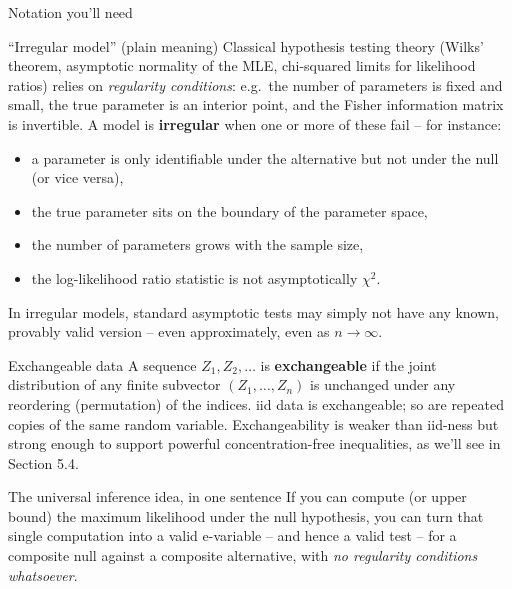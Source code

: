 \documentclass[aspectratio=169,10pt]{beamer}
\begin{document}
\begin{frame}[allowframebreaks]{Notation you'll need}
  \begin{block}{``Irregular model'' (plain meaning)}
    Classical hypothesis testing theory (Wilks' theorem, asymptotic
    normality of the MLE, chi-squared limits for likelihood ratios)
    relies on \emph{regularity conditions}: e.g.\ the number of
    parameters is fixed and small, the true parameter is an interior
    point, and the Fisher information matrix is invertible. A model is
    \textbf{irregular} when one or more of these fail -- for instance:
    \begin{itemize}
      \item a parameter is only identifiable under the alternative but
        not under the null (or vice versa),
      \item the true parameter sits on the boundary of the parameter
        space,
      \item the number of parameters grows with the sample size,
      \item the log-likelihood ratio statistic is not asymptotically
        $\chi^2$.
    \end{itemize}
    In irregular models, standard asymptotic tests may simply not have
    any known, provably valid version -- even approximately, even as
    $n\to\infty$.
  \end{block}

  \framebreak

  \begin{block}{Exchangeable data}
    A sequence $Z_1, Z_2, \ldots$ is \textbf{exchangeable} if the joint
    distribution of any finite subvector
    $(Z_1,\ldots,Z_n)$ is unchanged under any reordering (permutation)
    of the indices. iid data is exchangeable; so are repeated copies of
    the same random variable. Exchangeability is weaker than iid-ness
    but strong enough to support powerful concentration-free
    inequalities, as we'll see in Section 5.4.
  \end{block}

  \begin{alertblock}{The universal inference idea, in one sentence}
    If you can compute (or upper bound) the maximum likelihood under
    the null hypothesis, you can turn that single computation into a
    valid e-variable -- and hence a valid test -- for a composite null
    against a composite alternative, with \emph{no regularity
    conditions whatsoever}.
  \end{alertblock}

\end{frame}
\end{document}
